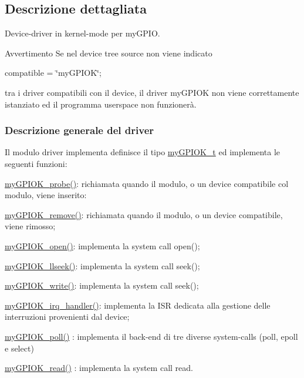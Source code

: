 \subsection{Descrizione dettagliata}
Device-\/driver in kernel-\/mode per my\+G\+P\+I\+O. 

\begin{DoxyWarning}{Avvertimento}
Se nel device tree source non viene indicato \begin{center}compatible = \char`\"{}my\+G\+P\+I\+O\+K\char`\"{};\end{center}  tra i driver compatibili con il device, il driver my\+G\+P\+I\+O\+K non viene correttamente istanziato ed il programma userspace non funzionerà.
\end{DoxyWarning}
\subsubsection*{Descrizione generale del driver}

Il modulo driver implementa definisce il tipo \hyperlink{structmy_g_p_i_o_k__t}{my\+G\+P\+I\+O\+K\+\_\+t} ed implementa le seguenti funzioni\+:
\begin{DoxyItemize}
\item \hyperlink{group___linux-_driver_gae40973a06d72f7c41a9af07513a62307}{my\+G\+P\+I\+O\+K\+\_\+probe()}\+: richiamata quando il modulo, o un device compatibile col modulo, viene inserito\+:
\item \hyperlink{group___linux-_driver_ga59fddfaa36dea357f4bbdfceb0f47f8c}{my\+G\+P\+I\+O\+K\+\_\+remove()}\+: richiamata quando il modulo, o un device compatibile, viene rimosso;
\item \hyperlink{group___linux-_driver_gad013759c18fbf6ea96005b9b3bfa5b4e}{my\+G\+P\+I\+O\+K\+\_\+open()}\+: implementa la system call open();
\item \hyperlink{group___linux-_driver_ga66e7f726b72320a272b633ecbaecefff}{my\+G\+P\+I\+O\+K\+\_\+llseek()}\+: implementa la system call seek();
\item \hyperlink{group___linux-_driver_ga1eea0f6c86e8966ba9b701da57502aad}{my\+G\+P\+I\+O\+K\+\_\+write()}\+: implementa la system call seek();
\item \hyperlink{group___linux-_driver_ga2fc230a12a97aa63e43b2dc4aec73511}{my\+G\+P\+I\+O\+K\+\_\+irq\+\_\+handler()}\+: implementa la I\+S\+R dedicata alla gestione delle interruzioni provenienti dal device;
\item \hyperlink{group___linux-_driver_gaba935e8a8215c2ebce9a7147fd4f5147}{my\+G\+P\+I\+O\+K\+\_\+poll()} \+: implementa il back-\/end di tre diverse system-\/calls (poll, epoll e select)
\item \hyperlink{group___linux-_driver_ga90ac339df9c02ae5f11a2a7727adc923}{my\+G\+P\+I\+O\+K\+\_\+read()} \+: implementa la system call read.
\end{DoxyItemize}

